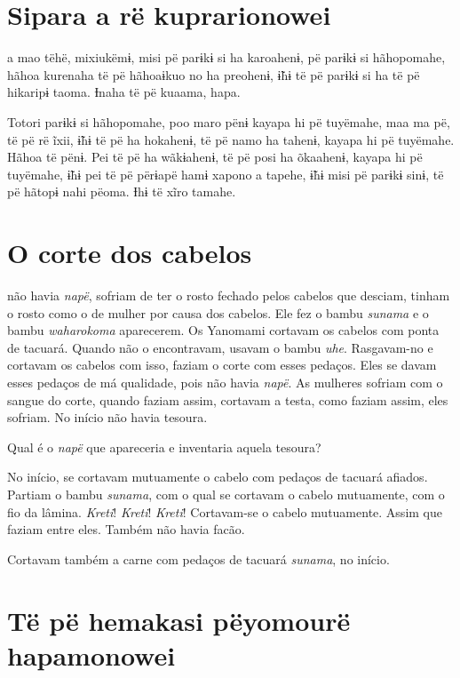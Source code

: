 \chapter{Sipara a rë kuprarionowei}
 
 a mao tëhë, mixiukëmɨ, misi pë parɨkɨ si ha karoahenɨ, pë
parɨkɨ si hãhopomahe, hãhoa kurenaha të pë hãhoaɨkuo no ha preohenɨ,
ɨ̃hɨ të pë parɨkɨ si ha të pë hikaripɨ taoma. Ɨnaha të pë kuaama, hapa. 

Totori parɨkɨ si hãhopomahe, poo maro pënɨ kayapa hi pë tuyëmahe, maa ma
pë, të pë rë ĩxii, ɨ̃hɨ të pë ha hokahenɨ, të pë namo ha tahenɨ, kayapa
hi pë tuyëmahe. Hãhoa të pënɨ. Pei të pë ha wãkɨahenɨ, të pë posi ha
õkaahenɨ, kayapa hi pë tuyëmahe, ɨ̃hɨ pei të pë përɨapë hamɨ xapono a
tapehe, ɨ̃hɨ misi pë parɨkɨ sinɨ, të pë hãtopɨ nahi pëoma. Ɨhɨ të xĩro
tamahe. 

\chapter{O corte dos cabelos}
 
 não havia \textit{napë}, sofriam de ter o rosto fechado pelos
cabelos que desciam, tinham o rosto como o de mulher por causa dos
cabelos. Ele fez o bambu \textit{sunama} e o
bambu \textit{waharokoma} aparecerem. Os Yanomami cortavam os
cabelos com ponta de tacuará. Quando não o encontravam, usavam o
bambu \textit{uhe}. Rasgavam-no e cortavam os cabelos com isso, faziam o
corte com esses pedaços. Eles se davam esses pedaços de má qualidade,
pois não havia \textit{napë}. As mulheres sofriam com o sangue do corte,
quando faziam assim, cortavam a testa, como faziam assim, eles sofriam.
No início não havia tesoura. 

Qual é o \textit{napë} que apareceria e inventaria aquela tesoura?

No início, se cortavam mutuamente o cabelo com pedaços de tacuará
afiados. Partiam o bambu \textit{sunama}, com o qual se cortavam o cabelo
mutuamente, com o fio da lâmina. \textit{Kreti}! \textit{Kreti}! \textit{Kreti}! Cortavam-se o
cabelo mutuamente. Assim que faziam entre eles. Também não havia facão. 

Cortavam também a carne com pedaços de tacuará \textit{sunama}, no início.

\chapter[Të pë hemakasi pëyomou rë hapamonowei]{Të pë hemakasi pëyomou\break rë hapamonowei}
 
